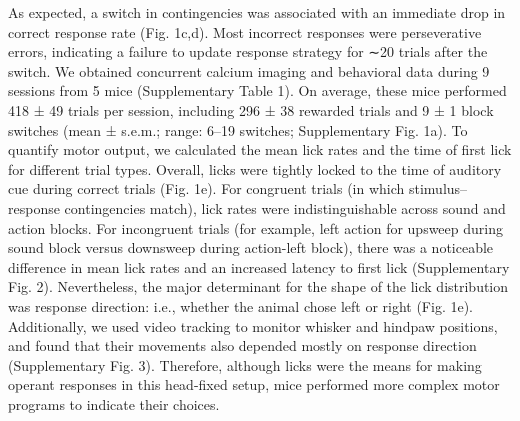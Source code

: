 As expected, a switch in contingencies was associated with an immediate drop in correct response rate (Fig. 1c,d). Most incorrect responses were perseverative errors, indicating a failure to update response strategy for ∼20 trials after the switch. We obtained concurrent calcium imaging and behavioral data during 9 sessions from 5 mice (Supplementary Table 1). On average, these mice performed 418 ± 49 trials per session, including 296 ± 38 rewarded trials and 9 ± 1 block switches (mean ± s.e.m.; range: 6–19 switches; Supplementary Fig. 1a). To quantify motor output, we calculated the mean lick rates and the time of first lick for different trial types. Overall, licks were tightly locked to the time of auditory cue during correct trials (Fig. 1e). For congruent trials (in which stimulus–response contingencies match), lick rates were indistinguishable across sound and action blocks. For incongruent trials (for example, left action for upsweep during sound block versus downsweep during action-left block), there was a noticeable difference in mean lick rates and an increased latency to first lick (Supplementary Fig. 2). Nevertheless, the major determinant for the shape of the lick distribution was response direction: i.e., whether the animal chose left or right (Fig. 1e). Additionally, we used video tracking to monitor whisker and hindpaw positions, and found that their movements also depended mostly on response direction (Supplementary Fig. 3). Therefore, although licks were the means for making operant responses in this head-fixed setup, mice performed more complex motor programs to indicate their choices.

